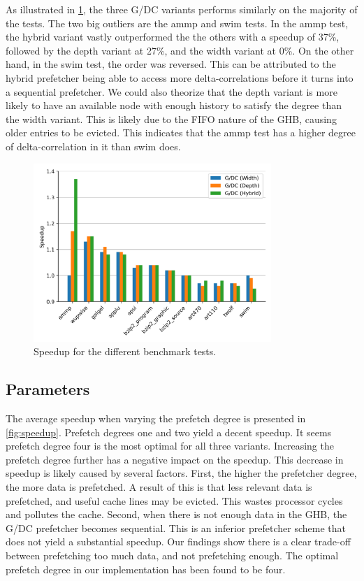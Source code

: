 \documentclass[conference]{IEEEtran}
\begin{document}
As illustrated in \cref{fig:tests}, the three G/DC variants performs similarly on the majority of the tests. The two big outliers are the ammp and swim tests. In the ammp test, the hybrid variant vastly outperformed the the others with a speedup of 37\%, followed by the depth variant at 27\%, and the width variant at 0\%. On the other hand, in the swim test, the order was reversed. This can be attributed to the hybrid prefetcher being able to access more delta-correlations before it turns into a sequential prefetcher. We could also theorize that the depth variant is more likely to have an available node with enough history to satisfy the degree than the width variant. This is likely due to the FIFO nature of the GHB, causing older entries to be evicted. This indicates that the ammp test has a higher degree of delta-correlation in it than swim does.

\begin{figure}[H]
    \centering
     \includegraphics[width=90mm]{assets/tests.png}
    \vspace{-7mm}
    \caption{Speedup for the different benchmark tests.}
    \label{fig:tests}
\end{figure}

\subsection{Parameters}

The average speedup when varying the prefetch degree is presented in \cref{fig:speedup}. Prefetch degrees one and two yield a decent speedup. It seems prefetch degree four is the most optimal for all three variants. Increasing the prefetch degree further has a negative impact on the speedup. This decrease in speedup is likely caused by several factors. First, the higher the prefetcher degree, the more data is prefetched. A result of this is that less relevant data is prefetched, and useful cache lines may be evicted. This wastes processor cycles and pollutes the cache. Second, when there is not enough data in the GHB, the G/DC prefetcher becomes sequential. This is an inferior prefetcher scheme that does not yield a substantial speedup. Our findings show there is a clear trade-off between prefetching too much data, and not prefetching enough. The optimal prefetch degree in our implementation has been found to be four. 
\end{document}
